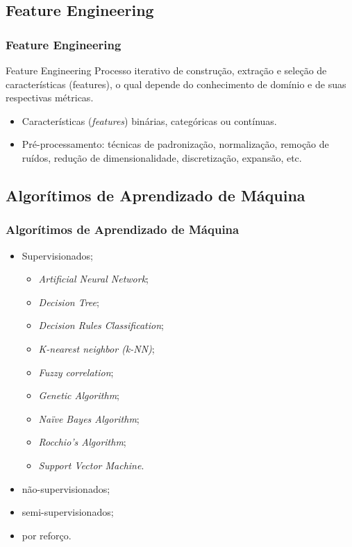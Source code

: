 \documentclass{beamer}
\begin{document}
\subsection{Feature Engineering}
\begin{frame}
\frametitle{Feature Engineering}
\begin{block}{Feature Engineering}
Processo iterativo de construção, extração e seleção de características (features), o qual depende do conhecimento de domínio e de suas respectivas métricas.
\end{block}
\begin{itemize}
\item Características (\textit{features}) binárias, categóricas ou contínuas.
\item Pré-processamento: técnicas de padronização, normalização, remoção de ruídos, redução de dimensionalidade, discretização, expansão, etc.
\end{itemize}
\end{frame}
\subsection{Algorítimos de Aprendizado de Máquina}
\begin{frame}
\frametitle {Algorítimos de Aprendizado de Máquina}
\begin{itemize}
\item Supervisionados;
\begin{itemize}
\item \textit{Artificial Neural Network};
\item \textit{Decision Tree};
\item \textit{Decision Rules Classification};
\item \textit{K-nearest neighbor (k-NN)};
\item \textit{Fuzzy correlation};
\item \textit{Genetic Algorithm};
\item \textit{Naïve Bayes Algorithm};
\item \textit{Rocchio's Algorithm};
\item \textit{Support Vector Machine}.
\end{itemize}
\item não-supervisionados;
\item semi-supervisionados;
\item por reforço.
\end{itemize}
\end{frame}
\end{document}
